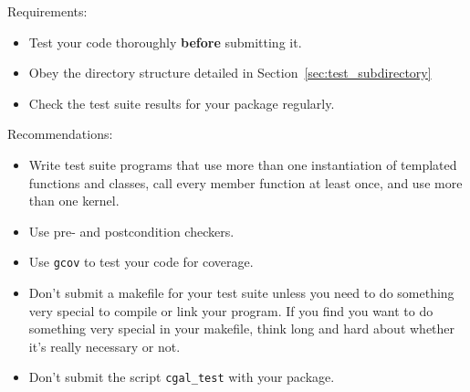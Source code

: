\noindent
Requirements:
\begin{itemize}
   \item Test your code thoroughly \textbf{before} submitting it.
   \item Obey the directory structure detailed in Section~\ref{sec:test_subdirectory}
   \item Check the test suite results for your package regularly. 
\end{itemize}

\noindent
Recommendations:
\begin{itemize}
   \item Write test suite programs that use more than one instantiation of
         templated functions and classes, call every member function at least
         once, and use more than one kernel. 
   \item Use pre- and postcondition checkers.
   \item Use \texttt{gcov} to test your code for coverage.
   \item Don't submit a makefile for your test suite unless you need to do
         something very special to compile or link your program.  If you find
         you want to do something very special in your makefile, think long
         and hard about whether it's really necessary or not.
   \item Don't submit the script \texttt{cgal\_test} with your package.
\end{itemize}




